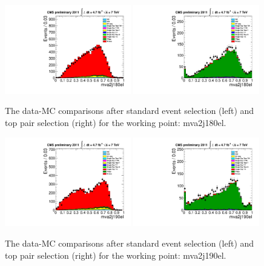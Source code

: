 \begin{figure}[!t]
  \centering
  \includegraphics[width=0.49\textwidth]{figs/cl-mva2j180el-normal.pdf}
  \includegraphics[width=0.49\textwidth]{figs/cl-mva2j180el-inTTbar.pdf}
  \caption{\label{fig:mva:plots-mva2j180el} The data-MC comparisons
    after standard event selection (left) and top pair
    selection (right) for the working point: mva2j180el.}
\end{figure}

\begin{figure}[!t]
  \centering
  \includegraphics[width=0.49\textwidth]{figs/cl-mva2j190el-normal.pdf}
  \includegraphics[width=0.49\textwidth]{figs/cl-mva2j190el-inTTbar.pdf}
  \caption{\label{fig:mva:plots-mva2j190el} The data-MC comparisons
    after standard event selection (left) and top pair
    selection (right) for the working point: mva2j190el.}
\end{figure}

